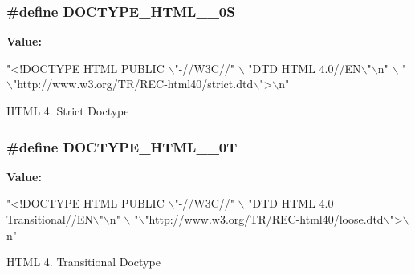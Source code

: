 \subsubsection[{\texorpdfstring{D\+O\+C\+T\+Y\+P\+E\+\_\+\+H\+T\+M\+L\+\_\+4\+\_\+0S}{DOCTYPE_HTML_4_0S}}]{\setlength{\rightskip}{0pt plus 5cm}\#define D\+O\+C\+T\+Y\+P\+E\+\_\+\+H\+T\+M\+L\+\_\+\_\+0S}\hypertarget{group__APACHE__CORE__DAEMON_ga1de1c29435101cf2d912b20e2f247f84}{}\label{group__APACHE__CORE__DAEMON_ga1de1c29435101cf2d912b20e2f247f84}
{\bfseries Value\+:}
\begin{DoxyCode}
\textcolor{stringliteral}{"<!DOCTYPE HTML PUBLIC \(\backslash\)"-//W3C//"} \(\backslash\)
                          \textcolor{stringliteral}{"DTD HTML 4.0//EN\(\backslash\)"\(\backslash\)n"} \(\backslash\)
                          \textcolor{stringliteral}{"\(\backslash\)"http://www.w3.org/TR/REC-html40/strict.dtd\(\backslash\)">\(\backslash\)n"}
\end{DoxyCode}
H\+T\+ML 4. Strict Doctype 
\subsubsection[{\texorpdfstring{D\+O\+C\+T\+Y\+P\+E\+\_\+\+H\+T\+M\+L\+\_\+4\+\_\+0T}{DOCTYPE_HTML_4_0T}}]{\setlength{\rightskip}{0pt plus 5cm}\#define D\+O\+C\+T\+Y\+P\+E\+\_\+\+H\+T\+M\+L\+\_\+\_\+0T}\hypertarget{group__APACHE__CORE__DAEMON_ga774d5c6a0abb4bb9765b73644d7fa0ad}{}\label{group__APACHE__CORE__DAEMON_ga774d5c6a0abb4bb9765b73644d7fa0ad}
{\bfseries Value\+:}
\begin{DoxyCode}
\textcolor{stringliteral}{"<!DOCTYPE HTML PUBLIC \(\backslash\)"-//W3C//"} \(\backslash\)
                          \textcolor{stringliteral}{"DTD HTML 4.0 Transitional//EN\(\backslash\)"\(\backslash\)n"} \(\backslash\)
                          \textcolor{stringliteral}{"\(\backslash\)"http://www.w3.org/TR/REC-html40/loose.dtd\(\backslash\)">\(\backslash\)n"}
\end{DoxyCode}
H\+T\+ML 4. Transitional Doctype 
